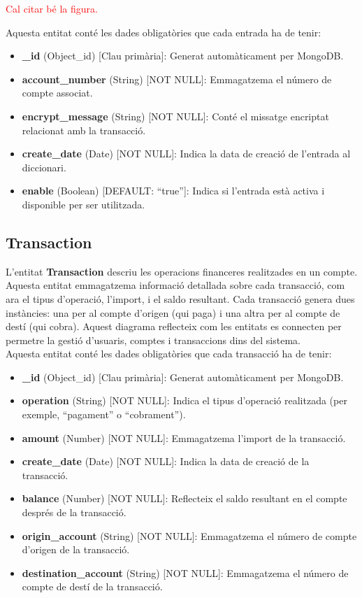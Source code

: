 \documentclass[a4paper,12pt,twoside]{ThesisStyle}
\newcommand{\pau}[1]{\textcolor{red}{#1}}
\begin{document}
\pau{Cal citar bé la figura.}

Aquesta entitat conté les dades obligatòries que cada entrada ha de tenir:

\begin{itemize}
    \item \textbf{\_id} (Object\_id) [Clau primària]: Generat automàticament per MongoDB.
    \item \textbf{account\_number} (String) [NOT NULL]: Emmagatzema el número de compte associat.
    \item \textbf{encrypt\_message} (String) [NOT NULL]: Conté el missatge encriptat relacionat amb la transacció.
    \item \textbf{create\_date} (Date) [NOT NULL]: Indica la data de creació de l'entrada al diccionari.
    \item \textbf{enable} (Boolean) [DEFAULT: ``true'']: Indica si l'entrada està activa i disponible per ser utilitzada.
\end{itemize}



\subsection{Transaction}
\label{subsec: Transaction}


L'entitat \textbf{Transaction} descriu les operacions financeres realitzades en un compte. Aquesta entitat emmagatzema informació detallada sobre cada transacció, com ara el tipus d'operació, l'import, i el saldo resultant. Cada transacció genera dues instàncies: una per al compte d'origen (qui paga) i una altra per al compte de destí (qui cobra). Aquest diagrama reflecteix com les entitats es connecten per permetre la gestió d'usuaris, comptes i transaccions dins del sistema.\\

Aquesta entitat conté les dades obligatòries que cada transacció ha de tenir:

\begin{itemize}
    \item \textbf{\_id} (Object\_id) [Clau primària]: Generat automàticament per MongoDB.
    \item \textbf{operation} (String) [NOT NULL]: Indica el tipus d'operació realitzada (per exemple, ``pagament'' o ``cobrament'').
    \item \textbf{amount} (Number) [NOT NULL]: Emmagatzema l'import de la transacció.
    \item \textbf{create\_date} (Date) [NOT NULL]: Indica la data de creació de la transacció.
    \item \textbf{balance} (Number) [NOT NULL]: Reflecteix el saldo resultant en el compte després de la transacció.
    \item \textbf{origin\_account} (String) [NOT NULL]: Emmagatzema el número de compte d'origen de la transacció.
    \item \textbf{destination\_account} (String) [NOT NULL]: Emmagatzema el número de compte de destí de la transacció.
\end{itemize}
\end{document}
